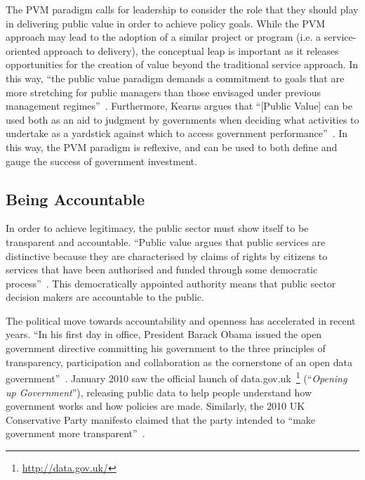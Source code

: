 \documentclass[conference]{IEEEtran}
\begin{document}
The PVM paradigm calls for leadership to consider the role that they
should play in delivering public value in order to achieve policy
goals. While the PVM approach may lead to the adoption of a similar
project or program (i.e. a service-oriented approach to delivery), the
conceptual leap is important as it releases opportunities for the
creation of value beyond the traditional service approach. In this
way, ``the public value paradigm demands a commitment to goals that
are more stretching for public managers than those envisaged under
previous management regimes''~\cite{stoker:2006}. Furthermore, Kearns
argues that ``[Public Value] can be used both as an aid to judgment by
governments when deciding what activities to undertake as a yardstick
against which to access government
performance''~\cite{kearns:2004}. In this way, the PVM paradigm is
reflexive, and can be used to both define and gauge the success of
government investment.

\subsection{Being Accountable}
In order to achieve legitimacy, the public sector must show itself to
be transparent and accountable. ``Public value argues that public
services are distinctive because they are characterised by claims of
rights by citizens to services that have been authorised and funded
through some democratic process''~\cite{coats+passmore:2008}. This
democratically appointed authority means that public sector decision
makers are accountable to the public.

The political move towards accountability and openness has accelerated
in recent years. ``In his first day in office, President Barack Obama
issued the open government directive committing his government to the
three principles of transparency, participation and collaboration as
the cornerstone of an open data
government''~\cite{coleman:2011}. January 2010 saw the official launch
of data.gov.uk~\footnote{\url{http://data.gov.uk/}} (``{\emph{Opening up
Government}}''), releasing public data to help people understand how
government works and how policies are made. Similarly, the 2010 UK
Conservative Party manifesto claimed that the party intended to ``make
government more transparent''~\cite{conparty:2010}.
\end{document}
